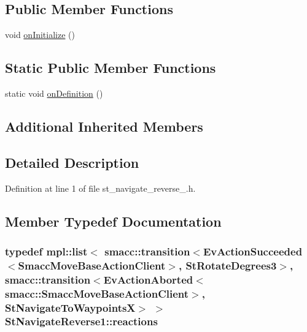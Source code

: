 \subsection*{Public Member Functions}
\begin{DoxyCompactItemize}
\item 
void \hyperlink{structStNavigateReverse1_a1931019c55ee6ff0330fdf0ec04f96eb}{on\+Initialize} ()
\end{DoxyCompactItemize}
\subsection*{Static Public Member Functions}
\begin{DoxyCompactItemize}
\item 
static void \hyperlink{structStNavigateReverse1_addd7fc2454ddd7b3b85d30fd6715e0f8}{on\+Definition} ()
\end{DoxyCompactItemize}
\subsection*{Additional Inherited Members}


\subsection{Detailed Description}


Definition at line 1 of file st\+\_\+navigate\+\_\+reverse\+\_.\+h.



\subsection{Member Typedef Documentation}
\subsubsection[{\texorpdfstring{reactions}{reactions}}]{\setlength{\rightskip}{0pt plus 5cm}typedef mpl\+::list$<$ {\bf smacc\+::transition}$<$Ev\+Action\+Succeeded$<$Smacc\+Move\+Base\+Action\+Client$>$, {\bf St\+Rotate\+Degrees3}$>$, {\bf smacc\+::transition}$<$Ev\+Action\+Aborted$<${\bf smacc\+::\+Smacc\+Move\+Base\+Action\+Client}$>$, {\bf St\+Navigate\+To\+WaypointsX}$>$ $>$ {\bf St\+Navigate\+Reverse1\+::reactions}}\hypertarget{structStNavigateReverse1_a788570292e8d645a6305a4d3c268fd6f}{}\label{structStNavigateReverse1_a788570292e8d645a6305a4d3c268fd6f}


